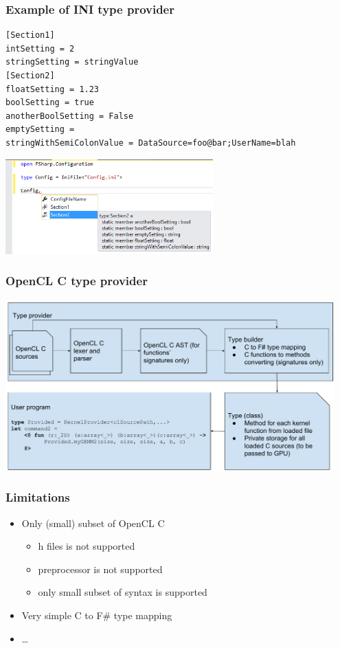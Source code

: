 \documentclass[xcolor=table]{beamer}
\begin{document}
\begin{frame}[fragile]
  \transwipe[direction=90]
  \frametitle{Example of INI type provider}

\tiny{
\begin{verbatim}
[Section1]
intSetting = 2
stringSetting = stringValue
[Section2]
floatSetting = 1.23
boolSetting = true
anotherBoolSetting = False
emptySetting =
stringWithSemiColonValue = DataSource=foo@bar;UserName=blah 
\end{verbatim}
}
\includegraphics[width=0.6\textwidth]{pictures/INIExample.png}

\end{frame}

 
\begin{frame}
  \transwipe[direction=90]
  \frametitle{OpenCL C type provider}
    
  \includegraphics[width=0.95\textwidth]{pictures/OpenCL_C_TP.pdf}
  \\
\end{frame}

\begin{frame}
  \transwipe[direction=90]
  \frametitle{Limitations}
\begin{itemize}
\item Only (small) subset of OpenCL C
 \begin{itemize}
 \item h files is not supported
 \item preprocessor is not supported
 \item only small subset of syntax is supported
  \end{itemize}
\item Very simple C to F\# type mapping
\item \dots
\end{itemize}

\end{frame}
\end{document}

